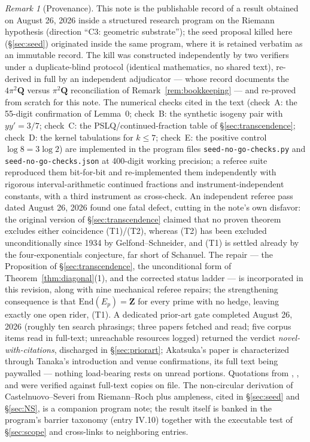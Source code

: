 \documentclass[11pt]{article}
\theoremstyle{definition}
\theoremstyle{remark}
\newtheorem*{remarkunnum}{Remark}
\newcommand{\Z}{\mathbf{Z}}
\newcommand{\Q}{\mathbf{Q}}
\newcommand{\End}{\mathrm{End}}
\begin{document}
\begin{remarkunnum}[Provenance]
This note is the publishable record of a result obtained on August 26, 2026
inside a structured research program on the Riemann hypothesis (direction
``C3: geometric substrate''); the seed proposal killed here
(\S\ref{sec:seed}) originated inside the same program, where it is retained
verbatim as an immutable record. The kill was constructed independently by
two verifiers under a duplicate-blind protocol (identical mathematics, no
shared text), re-derived in full by an independent adjudicator --- whose
record documents the $4\pi^2\Q$ versus $\pi^2\Q$ reconciliation of
Remark~\ref{rem:bookkeeping} --- and re-proved from scratch for this note.
The numerical checks cited in the text (check~A: the 55-digit confirmation
of Lemma~0; check~B: the synthetic isogeny pair with $y y' = 3/7$; check~C:
the PSLQ/continued-fraction table of \S\ref{sec:transcendence}; check~D: the
kernel tabulations for $k \leq 7$; check~E: the positive control
$\log 8 = 3\log 2$) are implemented in the program files
\texttt{seed-no-go-checks.py} and \texttt{seed-no-go-checks.json} at
400-digit working precision; a referee suite reproduced them bit-for-bit and
re-implemented them independently with rigorous interval-arithmetic
continued fractions and instrument-independent constants, with a third
instrument as cross-check. An independent referee pass dated August 26, 2026
found one fatal defect, cutting in the note's own disfavor: the original
version of \S\ref{sec:transcendence} claimed that no proven theorem excludes
either coincidence (T1)/(T2), whereas (T2) has been excluded unconditionally
since 1934 by Gelfond--Schneider, and (T1) is settled already by the
four-exponentials conjecture, far short of Schanuel. The repair --- the
Proposition of \S\ref{sec:transcendence}, the unconditional form of
Theorem~\ref{thm:diagonal}(1), and the corrected status ladder --- is
incorporated in this revision, along with nine mechanical referee repairs;
the strengthening consequence is that $\End(E_p) = \Z$ for every prime with
no hedge, leaving exactly one open rider, (T1). A dedicated prior-art gate
completed August 26, 2026 (roughly ten search phrasings; three papers
fetched and read; five corpus items read in full-text; unreachable
resources logged) returned the verdict \emph{novel-with-citations},
discharged in \S\ref{sec:priorart}; Akatsuka's paper \cite{Ak09} is
characterized through Tanaka's introduction \cite{Ta20} and venue
confirmations, its full text being paywalled --- nothing load-bearing rests
on unread portions. Quotations from \cite{CC26}, \cite{CC25}, and
\cite{CE15} were verified against full-text copies on file. The
non-circular derivation of Castelnuovo--Severi from Riemann--Roch plus
ampleness, cited in \S\ref{sec:seed} and \S\ref{sec:NS}, is a companion
program note; the result itself is banked in the program's barrier taxonomy
(entry IV.10) together with the executable test of \S\ref{sec:scope} and
cross-links to neighboring entries.


\end{remarkunnum}
\end{document}
